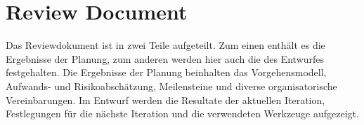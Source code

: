 \section*{Review Document}
Das Reviewdokument ist in zwei Teile aufgeteilt. 
Zum einen enthält es die Ergebnisse der Planung, zum anderen werden hier auch die des Entwurfes festgehalten.
Die Ergebnisse der Planung beinhalten das Vorgehensmodell, Aufwands- und Risikoabschätzung, Meilensteine und diverse organisatorische Vereinbarungen. Im Entwurf werden die Resultate der aktuellen Iteration, Festlegungen für die nächste Iteration und die verwendeten Werkzeuge aufgezeigt.
